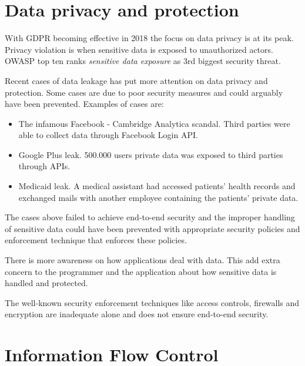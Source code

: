 \section{Data privacy and protection}

With GDPR becoming effective in 2018 the focus on data privacy is at its peak. 
Privacy violation is when sensitive data is exposed to unauthorized actors\cite{cwe}. OWASP top ten ranks \emph{sensitive data exposure} as 3rd biggest security threat\cite{owasp}. 

Recent cases of data leakage has put more attention on data privacy and protection. Some cases are due to poor security measures and could arguably have been prevented. Examples of cases are:

\begin{itemize}
	\item The infamous Facebook - Cambridge Analytica scandal. Third parties were able to collect data through Facebook Login API.
	\item Google Plus leak. 500.000 users private data was exposed to third parties through APIs\cite{googleplus}.
	\item Medicaid leak. A medical assistant had accessed patients' health records and exchanged mails with another employee containing the patients' private data\cite{medicaid}.  
\end{itemize}



The cases above failed to achieve end-to-end security and the improper handling of sensitive data could have been prevented with appropriate security policies and enforcement technique that enforces these policies.

There is more awareness on how applications deal with data. This add extra concern to the programmer and the application about how sensitive data is handled and protected.  

The well-known security enforcement techniques like access controls, firewalls and encryption are inadequate alone and does not ensure end-to-end security\cite{Sabelfeld2003}.








\section{Information Flow Control} %

